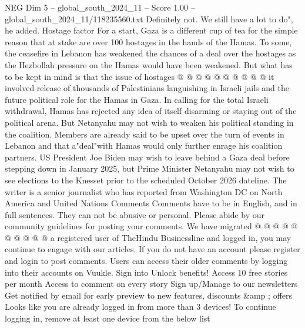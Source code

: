 \begin{textsample}{NEG Dim 5 – global\_south\_2024\_11 – Score 1.00 – global\_south\_2024\_11/118235560.txt}
Definitely not.
We still have a lot to do", he added.
Hostage factor For a start, Gaza is a different cup of tea for the simple reason that at stake are over 100 hostages in the hands of the Hamas.
To some, the ceasefire in Lebanon has weakened the chances of a deal over the hostages as the Hezbollah pressure on the Hamas would have been weakened.
But what has to be kept in mind is that the issue of hostages @ @ @ @ @ @ @ @ @ @ it involved release of thousands of Palestinians languishing in Israeli jails and the future political role for the Hamas in Gaza.
In calling for the total Israeli withdrawal, Hamas has rejected any idea of itself disarming or staying out of the political arena.
But Netanyahu may not wish to weaken his political standing in the coalition.
Members are already said to be upset over the turn of events in Lebanon and that a"deal"with Hamas would only further enrage his coalition partners.
US President Joe Biden may wish to leave behind a Gaza deal before stepping down in January 2025, but Prime Minister Netanyahu may not wish to see elections to the Knesset prior to the scheduled October 2026 dateline.
The writer is a senior journalist who has reported from Washington DC on North America and United Nations Comments Comments have to be in English, and in full sentences.
They can not be abusive or personal.
Please abide by our community guidelines for posting your comments.
We have migrated @ @ @ @ @ @ @ @ @ @ a registered user of TheHindu Businessline and logged in, you may continue to engage with our articles.
If you do not have an account please register and login to post comments.
Users can access their older comments by logging into their accounts on Vuukle.
Sign into Unlock benefits!
Access 10 free stories per month Access to comment on every story Sign up/Manage to our newsletters Get notified by email for early preview to new features, discounts \&amp ; offers Looks like you are already logged in from more than 3 devices!
To continue logging in, remove at least one device from the below list

\end{textsample}
